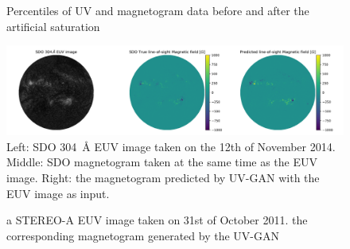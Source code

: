\documentclass[11pt,a4paper,onecolumn]{report}
\begin{document}
\begin{figure}
  \centering
  
  \caption{Percentiles of UV and magnetogram data before and after the artificial saturation}
  \label{fig:artificial_sat}
\end{figure}



\begin{figure}[t]%
  \includegraphics[width=\linewidth]{aia_hmi_mag.png}
  \caption[]{Left: SDO \SI{304}{\angstrom} EUV image taken on the 12th of
  November 2014. Middle: SDO magnetogram taken at the same time as the EUV
  image. Right: the magnetogram predicted by UV-GAN with the EUV image as
  input.}
  \label{fig:aia_hmi_mag}
\end{figure}

\begin{figure}[t]
  \centering
 \caption{ a STEREO-A EUV image taken on 31st of October
  2011.  the corresponding magnetogram generated by the
  UV-GAN}
  \label{fig:stereo_mag}
\end{figure}
\end{document}
